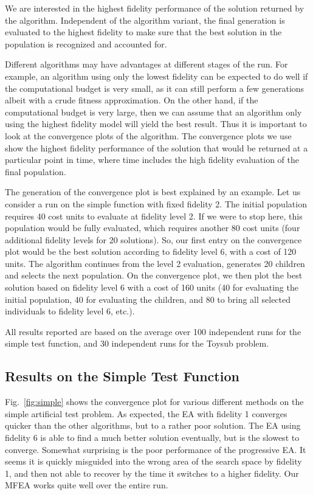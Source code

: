 We are interested in the highest fidelity performance of the solution returned by the algorithm. Independent of the algorithm variant, the final generation is evaluated to the highest fidelity to make sure that the best solution in the population is recognized and accounted for. 

Different algorithms may have advantages at different stages of the run. For example, an algorithm using only the lowest fidelity can be expected to do well if the computational budget is very small, as it can still perform a few generations albeit with a crude fitness approximation. On the other hand, if the computational budget is very large, then we can assume that an algorithm only using the highest fidelity model will yield the best result. Thus it is important to look at the convergence plots of the algorithm. The convergence plots we use show the highest fidelity performance of the solution that would be returned at a particular point in time, where time includes the high fidelity evaluation of the final population. 

The generation of the convergence plot is best explained by an example. Let us consider a run on the simple function with fixed fidelity 2. The initial population requires 40 cost units to evaluate at fidelity level 2. If we were to stop here, this population would be fully evaluated, which requires another 80 cost units (four additional fidelity levels for 20 solutions). So, our first entry on the convergence plot would be the best solution according to fidelity level 6, with a cost of 120 units. The algorithm continues from the level 2 evaluation, generates 20 children and selects the next population. On the convergence plot, we then plot the best solution based on fidelity level 6 with a cost of 160 units (40 for evaluating the initial population, 40 for evaluating the children, and 80 to bring all selected individuals to fidelity level 6, etc.).

All results reported are based on the average over 100 independent runs for the simple test function, and 30 independent runs for the Toysub problem.

\subsection{Results on the Simple Test Function}

Fig.~\ref{fig:simple} shows the convergence plot for various different methods on the simple artificial test problem. As expected, the EA with fidelity 1 converges quicker than the other algorithms, but to a rather poor solution. The EA using fidelity 6 is able to find a much better solution eventually, but is the slowest to converge. Somewhat surprising is the poor performance of the progressive EA. It seems it is quickly misguided into the wrong area of the search space by fidelity 1, and then not able to recover by the time it switches to a higher fidelity. Our MFEA works quite well over the entire run.

